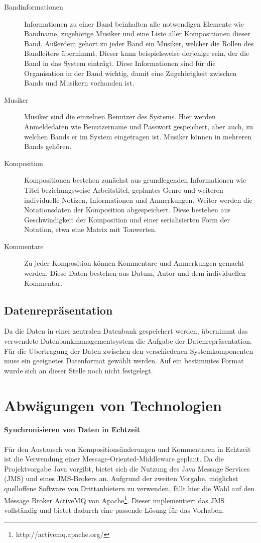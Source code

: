 \documentclass[12pt]{scrartcl}
\begin{document}
\begin{description}
\item[Bandinformationen]
Informationen zu einer Band beinhalten alle notwendigen Elemente wie Bandname, zugehörige Musiker und eine Liste aller Kompositionen dieser Band. Außerdem gehört zu jeder Band ein Musiker, welcher die Rollen des Bandleiters übernimmt. Dieser kann beispielsweise derjenige sein, der die Band in das System einträgt. Diese Informationen sind für die Organisation in der Band wichtig, damit eine Zugehörigkeit zwischen Bands und Musikern vorhanden ist.
\item[Musiker]
Musiker sind die einzelnen Benutzer des Systems. Hier werden Anmeldedaten wie Benutzername und Passwort gespeichert, aber auch, zu welchen Bands er im System eingetragen ist. Musiker können in mehreren Bands gehören.
\item[Komposition]
Kompositionen bestehen zunächst aus grundlegenden Informationen wie Titel beziehungsweise Arbeitstitel, geplantes Genre und weiteren individuelle Notizen, Informationen und Anmerkungen. Weiter werden die Notationsdaten der Komposition abgespeichert. Diese bestehen aus Geschwindigkeit der Komposition und einer serialisierten Form der Notation, etwa eine Matrix mit Tonwerten.
\item[Kommentare]
Zu jeder Komposition können Kommentare und Anmerkungen gemacht werden. Diese Daten bestehen aus Datum, Autor und dem individuellen Kommentar.
\end{description}

\subsection{Datenrepräsentation}
Da die Daten in einer zentralen Datenbank gespeichert werden, übernimmt das verwendete Datenbankmanagementsystem die Aufgabe der Datenrepräsentation. Für die Übertragung der Daten zwischen den verschiedenen Systemkomponenten muss ein geeignetes Datenformat gewählt werden. Auf ein bestimmtes Format wurde sich an dieser Stelle noch nicht festgelegt.


\section{Abwägungen von Technologien}

\paragraph*{Synchronisieren von Daten in Echtzeit}
Für den Austausch von Kompositionsänderungen und Kommentaren in Echtzeit ist die Verwendung einer Message-Oriented-Middleware geplant. Da die Projektvorgabe Java vorgibt, bietet sich die Nutzung des Java Message Services (JMS) und eines JMS-Brokers an. Aufgrund der zweiten Vorgabe, möglichst quelloffene Software von Drittanbietern zu verwenden, fällt hier die Wahl auf den Message Broker ActiveMQ von Apache\footnote{http://activemq.apache.org/}. Dieser implementiert das JMS vollständig und bietet dadurch eine passende Lösung für das Vorhaben.
\end{document}
